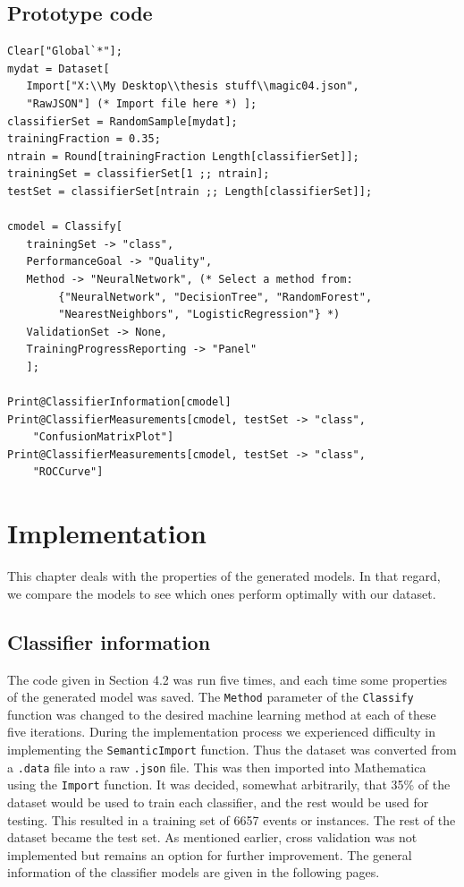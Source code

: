 \documentclass[a4paper, 12pt]{report}
\theoremstyle{definition}
\begin{document}
\section{Prototype code}
\begin{verbatim}
Clear["Global`*"];
mydat = Dataset[
   Import["X:\\My Desktop\\thesis stuff\\magic04.json",
   "RawJSON"] (* Import file here *) ];
classifierSet = RandomSample[mydat];
trainingFraction = 0.35;
ntrain = Round[trainingFraction Length[classifierSet]];
trainingSet = classifierSet[1 ;; ntrain];
testSet = classifierSet[ntrain ;; Length[classifierSet]];

cmodel = Classify[
   trainingSet -> "class",
   PerformanceGoal -> "Quality",
   Method -> "NeuralNetwork", (* Select a method from:
        {"NeuralNetwork", "DecisionTree", "RandomForest", 
        "NearestNeighbors", "LogisticRegression"} *)
   ValidationSet -> None,
   TrainingProgressReporting -> "Panel"
   ];

Print@ClassifierInformation[cmodel] 
Print@ClassifierMeasurements[cmodel, testSet -> "class",
    "ConfusionMatrixPlot"]
Print@ClassifierMeasurements[cmodel, testSet -> "class",
    "ROCCurve"]
\end{verbatim}

\chapter{Implementation}

This chapter deals with the properties of the generated models. In that regard, we compare the models to see which ones perform optimally with our dataset.

\section{Classifier information}

The code given in Section 4.2 was run five times, and each time some properties of the generated model was saved. The \texttt{Method} parameter of the \texttt{Classify} function was changed to the desired machine learning method at each of these five iterations. During the implementation process we experienced difficulty in implementing the \texttt{SemanticImport} function. Thus the dataset was converted from a \texttt{.data} file into a raw \texttt{.json} file. This was then imported into Mathematica using the \texttt{Import} function. It was decided, somewhat arbitrarily, that 35\% of the dataset would be used to train each classifier, and the rest would be used for testing. This resulted in a training set of 6657 events or instances. The rest of the dataset became the test set. As mentioned earlier, cross validation was not implemented but remains an option for further improvement. The general information of the classifier models are given in the following pages.
\end{document}
